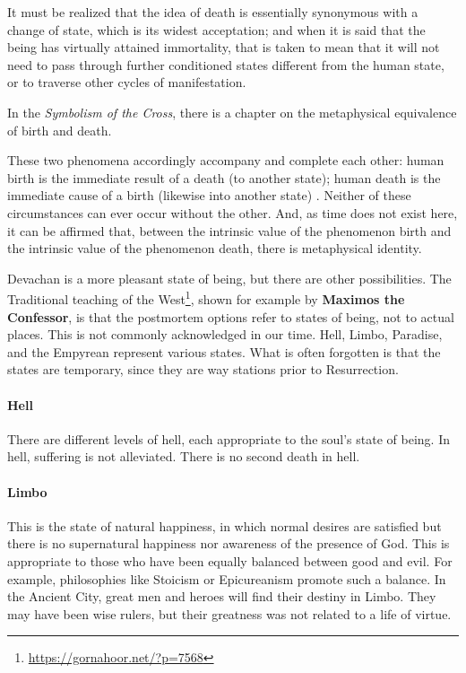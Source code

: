 \begin{quotex}
It must be realized that the idea of death is essentially synonymous with a change of state, which is its widest acceptation; and when it is said that the being has virtually attained immortality, that is taken to mean that it will not need to pass through further conditioned states different from the human state, or to traverse other cycles of manifestation.
\end{quotex}


In the \emph{Symbolism of the Cross}, there is a chapter on the metaphysical equivalence of birth and death.

\begin{quotex}
These two phenomena accordingly accompany and complete each other: human birth is the immediate result of a death (to another state); human death is the immediate cause of a birth (likewise into another state) . Neither of these circumstances can ever occur without the other. And, as time does not exist here, it can be affirmed that, between the intrinsic value of the phenomenon birth and the intrinsic value of the phenomenon death, there is metaphysical identity.
\end{quotex}


Devachan is a more pleasant state of being, but there are other possibilities. The Traditional teaching of the West\footnote{\url{https://gornahoor.net/?p=7568}}, shown for example by \textbf{Maximos the Confessor}, is that the postmortem options refer to states of being, not to actual places. This is not commonly acknowledged in our time. Hell, Limbo, Paradise, and the Empyrean represent various states. What is often forgotten is that the states are temporary, since they are way stations prior to Resurrection.

\paragraph{Hell}


There are different levels of hell, each appropriate to the soul's state of being. In hell, suffering is not alleviated. There is no second death in hell.

\paragraph{Limbo}


This is the state of natural happiness, in which normal desires are satisfied but there is no supernatural happiness nor awareness of the presence of God. This is appropriate to those who have been equally balanced between good and evil. For example, philosophies like Stoicism or Epicureanism promote such a balance. In the Ancient City, great men and heroes will find their destiny in Limbo. They may have been wise rulers, but their greatness was not related to a life of virtue.

